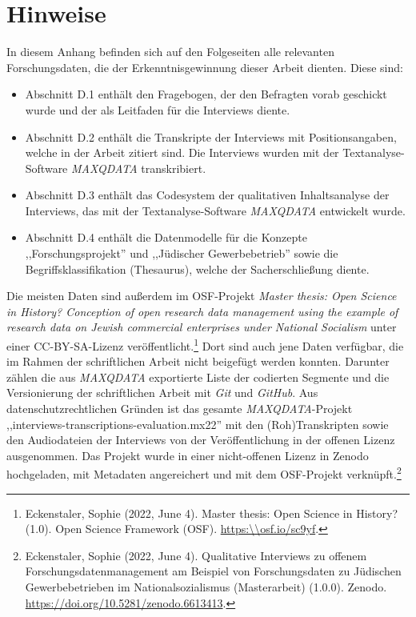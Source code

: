 
\section{Hinweise}

In diesem Anhang befinden sich auf den Folgeseiten alle relevanten Forschungsdaten, die der Erkenntnisgewinnung dieser Arbeit dienten. Diese sind:

\begin{itemize}
  \item Abschnitt D.1 enthält den Fragebogen, der den Befragten vorab geschickt wurde und der als Leitfaden für die Interviews diente.
  \item Abschnitt D.2 enthält die Transkripte der Interviews mit Positionsangaben, welche in der Arbeit zitiert sind. Die Interviews wurden mit der Textanalyse-Software \textit{MAXQDATA} transkribiert.
  \item Abschnitt D.3 enthält das Codesystem der qualitativen Inhaltsanalyse der Interviews, das mit der Textanalyse-Software \textit{MAXQDATA} entwickelt wurde.
  \item Abschnitt D.4 enthält die Datenmodelle für die Konzepte ,,Forschungsprojekt'' und ,,Jüdischer Gewerbebetrieb'' sowie die Begriffsklassifikation (Thesaurus), welche der Sacherschließung diente.
\end{itemize} 

Die meisten Daten sind außerdem im OSF-Projekt \textit{Master thesis: Open Science in History? Conception of open research data management using the example of research data on Jewish commercial enterprises under National Socialism} unter einer CC-BY-SA-Lizenz veröffentlicht.\footnote{Eckenstaler, Sophie (2022, June 4). Master thesis: Open Science in History? (1.0). Open Science Framework (OSF). \url{https:\\osf.io/sc9yf}.} Dort sind auch jene Daten verfügbar, die im Rahmen der schriftlichen Arbeit nicht beigefügt werden konnten. Darunter zählen die aus \textit{MAXQDATA} exportierte Liste der codierten Segmente und die Versionierung der schriftlichen Arbeit mit \textit{Git} und \textit{GitHub}. Aus datenschutzrechtlichen Gründen ist das gesamte \textit{MAXQDATA}-Projekt ,,interviews-transcriptions-evaluation.mx22'' mit den (Roh)Transkripten sowie den Audiodateien der Interviews von der Veröffentlichung in der offenen Lizenz ausgenommen. Das Projekt wurde in einer nicht-offenen Lizenz in Zenodo hochgeladen, mit Metadaten angereichert und mit dem OSF-Projekt verknüpft.\footnote{Eckenstaler, Sophie (2022, June 4). Qualitative Interviews zu offenem Forschungsdatenmanagement am Beispiel von Forschungsdaten zu Jüdischen Gewerbebetrieben im Nationalsozialismus (Masterarbeit) (1.0.0). Zenodo. \url{https://doi.org/10.5281/zenodo.6613413}.}

